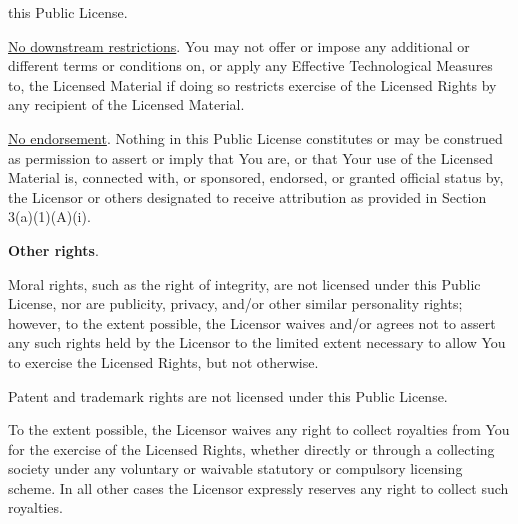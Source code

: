 \begin{myEnumerate}
\begin{myEnumerate}
\begin{myEnumerate}
           this Public License.
           \item \underline{No downstream restrictions}. You may not offer or impose any additional or different terms or
           conditions on, or apply any Effective Technological Measures to, the Licensed Material if doing so restricts
           exercise of the Licensed Rights by any recipient of the Licensed Material.
         \end{myEnumerate}
         \item \underline{No endorsement}. Nothing in this Public License constitutes or may be construed as permission to
         assert or imply that You are, or that Your use of the Licensed Material is, connected with, or sponsored, endorsed,
         or granted official status by, the Licensor or others designated to receive attribution as provided in Section
         3(a)(1)(A)(i).
      \end{myEnumerate}
      \item \textbf{Other rights}.
      \begin{myEnumerate}
        \item Moral rights, such as the right of integrity, are not licensed under this Public License, nor are publicity,
        privacy, and/or other similar personality rights; however, to the extent possible, the Licensor waives and/or agrees
        not to assert any such rights held by the Licensor to the limited extent necessary to allow You to exercise the
        Licensed Rights, but not otherwise.
        \item Patent and trademark rights are not licensed under this Public License.
        \item To the extent possible, the Licensor waives any right to collect royalties from You for the exercise of the
        Licensed Rights, whether directly or through a collecting society under any voluntary or waivable statutory or
        compulsory licensing scheme. In all other cases the Licensor expressly reserves any right to collect such royalties.
     \end{myEnumerate}
    \end{myEnumerate}

